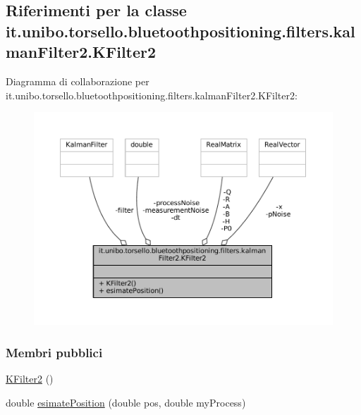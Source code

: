 \hypertarget{classit_1_1unibo_1_1torsello_1_1bluetoothpositioning_1_1filters_1_1kalmanFilter2_1_1KFilter2}{}\subsection{Riferimenti per la classe it.\+unibo.\+torsello.\+bluetoothpositioning.\+filters.\+kalman\+Filter2.\+K\+Filter2}
\label{classit_1_1unibo_1_1torsello_1_1bluetoothpositioning_1_1filters_1_1kalmanFilter2_1_1KFilter2}


Diagramma di collaborazione per it.\+unibo.\+torsello.\+bluetoothpositioning.\+filters.\+kalman\+Filter2.\+K\+Filter2\+:
\nopagebreak
\begin{figure}[H]
\begin{center}
\leavevmode
\includegraphics[width=350pt]{classit_1_1unibo_1_1torsello_1_1bluetoothpositioning_1_1filters_1_1kalmanFilter2_1_1KFilter2__coll__graph}
\end{center}
\end{figure}
\subsubsection*{Membri pubblici}
\begin{DoxyCompactItemize}
\item 
\hyperlink{classit_1_1unibo_1_1torsello_1_1bluetoothpositioning_1_1filters_1_1kalmanFilter2_1_1KFilter2_a7b8d897944a753c29b80361daf3d62b5_a7b8d897944a753c29b80361daf3d62b5}{K\+Filter2} ()
\item 
double \hyperlink{classit_1_1unibo_1_1torsello_1_1bluetoothpositioning_1_1filters_1_1kalmanFilter2_1_1KFilter2_a7cacbca71c01195a1ac7e00945d46f2f_a7cacbca71c01195a1ac7e00945d46f2f}{esimate\+Position} (double pos, double my\+Process)
\end{DoxyCompactItemize}
